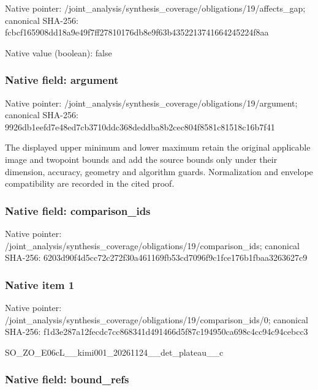 \documentclass[10pt,a4paper]{article}
\begin{document}
Native pointer: /joint\_analysis/synthesi\allowbreak{}s\_coverage/obligations/1\allowbreak{}9/affects\_gap; canonical SHA-256: fcbcf165908dd18a9e49f7ff\allowbreak{}27810176db8e9f63b4352213\allowbreak{}741664245224f8aa



Native value (boolean): false



\subsubsection{Native field: argument}


Native pointer: /joint\_analysis/synthesi\allowbreak{}s\_coverage/obligations/1\allowbreak{}9/argument; canonical SHA-256: 9926db1eefd7e48ed7cb3710\allowbreak{}ddc368deddba8b2cec804f85\allowbreak{}81c81518c16b7f41


The displayed upper minimum and lower maximum retain the original applicable image and twopoint bounds and add the source bounds only under their dimension, accuracy, geometry and algorithm guards. Normalization and envelope compatibility are recorded in the cited proof.


\subsubsection{Native field: comparison\_ids}


Native pointer: /joint\_analysis/synthesi\allowbreak{}s\_coverage/obligations/1\allowbreak{}9/comparison\_ids; canonical SHA-256: 6203d90f4d5cc72c272f30a4\allowbreak{}61169fb53cd7096f9c1fce17\allowbreak{}6b1fbaa3263627c9



\subsubsection{Native item 1}


Native pointer: /joint\_analysis/synthesi\allowbreak{}s\_coverage/obligations/1\allowbreak{}9/comparison\_ids/0; canonical SHA-256: f1d3e287a12fecdc7cc86834\allowbreak{}1d491466d5f87c194950ca69\allowbreak{}8c4cc94c94cebcc3


SO\_ZO\_E06cL\_\_kimi001\_202\allowbreak{}61124\_\_det\_plateau\_\_c


\subsubsection{Native field: bound\_refs}
\end{document}
